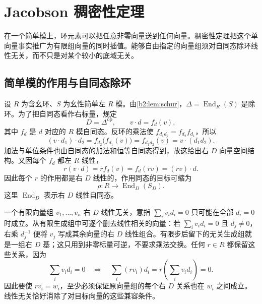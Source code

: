 
\section{Jacobson 稠密性定理}
\label{b2:sec:1404}

在一个简单模上，环元素可以把任意非零向量送到任何向量。稠密性定理把这个单向量事实推广为有限组向量的同时插值。能够自由指定的向量组须对自同态除环线性无关，而不只是对某个较小的底域无关。

%
%

\subsection{简单模的作用与自同态除环}
\label{b2:subsec:1404:01}

设 \(R\) 为含幺环、\(S\) 为幺性简单左 \(R\) 模。由\cref{b2:lem:schur}，\(\Delta=\operatorname{End}_R(S)\) 是除环。为了把自同态看作右标量，规定
\[
	D=\Delta^{\mathrm{op}},\qquad v\cdot d=f_d(v),
\]
其中 \(f_d\) 是 \(d\) 对应的 \(R\) 模自同态。反环的乘法使 \(f_{d_1d_2}=f_{d_2}f_{d_1}\)，所以
\[
	(v\cdot d_1)\cdot d_2 =f_{d_2}\bigl(f_{d_1}(v)\bigr) =f_{d_1d_2}(v) =v\cdot(d_1d_2).
\]
加法与单位条件也由自同态的加法和恒等自同态得到，故这给出右 \(D\) 向量空间结构。又因每个 \(f_d\) 都左 \(R\) 线性，
\[
	r(v\cdot d)=r f_d(v)=f_d(rv)=(rv)\cdot d.
\]
因此每个 \(r\) 的作用都是右 \(D\) 线性的，作用同态的目标可缩为
\[
	\rho:R\longrightarrow\operatorname{End}_D(S_D).
\]
这里 \(\operatorname{End}_D\) 表示右 \(D\) 线性自同态。

\ProseParagraphBreak
一个有限向量组 \(v_1,\ldots,v_n\) 右 \(D\) 线性无关，意指 \(\sum_i v_i d_i=0\) 只可能在全部 \(d_i=0\) 时成立。从有限生成组中可逐个删去线性相关的向量：若 \(\sum_i v_i d_i=0\) 且 \(d_j\ne0\)，右乘 \(d_j^{-1}\) 便将 \(v_j\) 写成其余向量的右 \(D\) 线性组合。有限步后留下的无关生成组就是一组右 \(D\) 基；这只用到非零标量可逆，不要求乘法交换。任何 \(r\in R\) 都保留这些关系，因为
\[
	\sum_i v_i d_i=0 \quad\Longrightarrow\quad \sum_i(rv_i)d_i=r\left(\sum_i v_i d_i\right)=0.
\]
因此要使 \(rv_i=w_i\)，至少必须保证原向量组的每个右 \(D\) 关系也在 \(w_i\) 之间成立。线性无关恰好消除了对目标向量的这些兼容条件。

